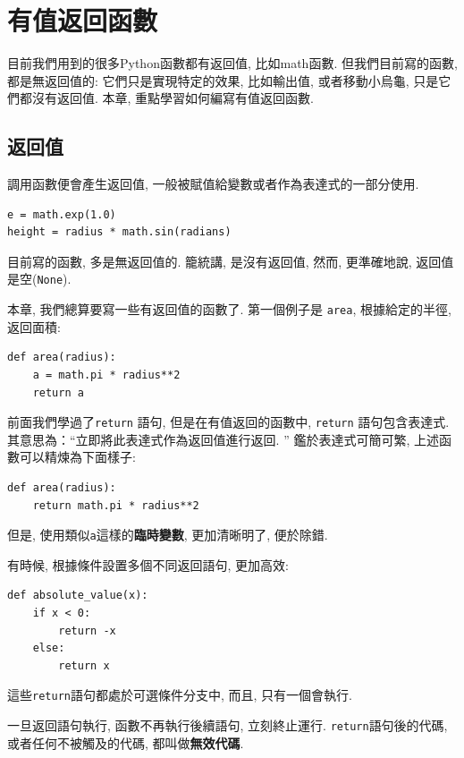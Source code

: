 \documentclass[10pt]{book}
\begin{document}
\chapter{有值返回函數}
\label{fruitchap}

目前我們用到的很多Python函數都有返回值, 比如math函數. 
但我們目前寫的函數, 都是無返回值的: 它們只是實現特定的效果, 比如輸出值, 
或者移動小烏龜, 只是它們都沒有返回值. 
本章, 重點學習如何編寫有值返回函數. 

\section{返回值}

調用函數便會產生返回值, 一般被賦值給變數或者作為表達式的一部分使用. 

\begin{verbatim}
e = math.exp(1.0)
height = radius * math.sin(radians)
\end{verbatim}
%
目前寫的函數, 多是無返回值的. 籠統講, 是沒有返回值, 然而, 
更準確地說, 返回值是空({\tt None}).

本章, 我們總算要寫一些有返回值的函數了. 
第一個例子是 {\tt area}, 根據給定的半徑, 返回面積:

\begin{verbatim}
def area(radius):
    a = math.pi * radius**2
    return a
\end{verbatim}
%
前面我們學過了{\tt return} 語句, 但是在有值返回的函數中, 
{\tt return} 語句包含表達式. 
其意思為：``立即將此表達式作為返回值進行返回. ''
鑑於表達式可簡可繁, 上述函數可以精煉為下面樣子:

\begin{verbatim}
def area(radius):
    return math.pi * radius**2
\end{verbatim}
%
但是, 使用類似{\tt a}這樣的{\bf 臨時變數}, 更加清晰明了, 便於除錯. 

有時候, 根據條件設置多個不同返回語句, 更加高效:

\begin{verbatim}
def absolute_value(x):
    if x < 0:
        return -x
    else:
        return x
\end{verbatim}
%
這些{\tt return}語句都處於可選條件分支中, 而且, 只有一個會執行. 

一旦返回語句執行, 函數不再執行後續語句, 立刻終止運行. 
{\tt return}語句後的代碼, 或者任何不被觸及的代碼, 都叫做{\bf 無效代碼}.
\end{document}
